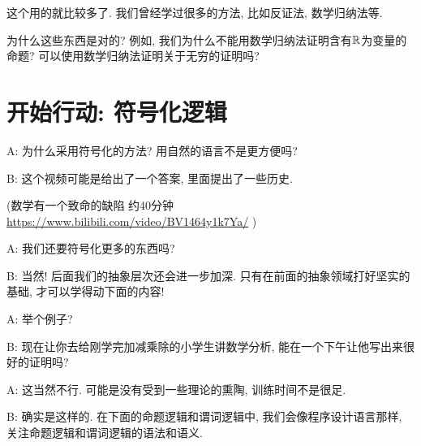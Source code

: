  这个用的就比较多了. 我们曾经学过很多的方法, 比如反证法, 数学归纳法等. 

\begin{bonus}
	为什么这些东西是对的? 例如, 我们为什么不能用数学归纳法证明含有$\mathbb{R}$为变量的命题? 可以使用数学归纳法证明关于无穷的证明吗? 
\end{bonus}

\section{开始行动: 符号化逻辑}



\begin{dialogue}
	A: 为什么采用符号化的方法? 用自然的语言不是更方便吗? 
	
	B: 这个视频可能是给出了一个答案, 里面提出了一些历史.
	
	(数学有一个致命的缺陷 约40分钟 \url{https://www.bilibili.com/video/BV1464y1k7Ya/} )
	
	A: 我们还要符号化更多的东西吗? 
	
	B: 当然! 后面我们的抽象层次还会进一步加深. 只有在前面的抽象领域打好坚实的基础, 才可以学得动下面的内容!
	
	A: 举个例子?
	
	B: 现在让你去给刚学完加减乘除的小学生讲数学分析, 能在一个下午让他写出来很好的证明吗? 
	
	A: 这当然不行. 可能是没有受到一些理论的熏陶, 训练时间不是很足. 
	
	B: 确实是这样的. 在下面的命题逻辑和谓词逻辑中, 我们会像程序设计语言那样, 关注命题逻辑和谓词逻辑的语法和语义. 
\end{dialogue}

